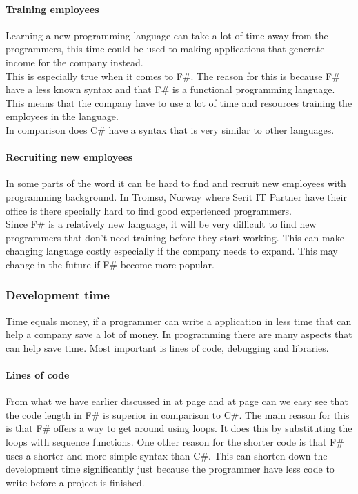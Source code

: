 \documentclass[12pt, a4paper]{article}
\begin{document}
\paragraph{Training employees}
Learning a new programming language can take a lot of time away from the programmers, this time could be used to making applications that generate income for the company instead.\\

This is especially true when it comes to F\#. The reason for this is because F\# have a less known syntax and that F\# is a functional programming language. This means that the company have to use a lot of time and resources training the employees in the language.\\

In comparison does C\# have a syntax that is very similar to other languages.

\paragraph{Recruiting new employees}
In some parts of the word it can be hard to find and recruit new employees with programming background. In Tromsø, Norway where Serit IT Partner have their office is there specially hard to find good experienced programmers.\\

Since F\# is a relatively new language, it will be very difficult to find new programmers that don't need training before they start working. This can make changing language costly especially if the company needs to expand. This may change in the future if F\# become more popular.

\newpage
\subsubsection{Development time}
\label{developmentTime}
Time equals money, if a programmer can write a application in less time that can help a company save a lot of money. In programming there are many aspects that can help save time. Most important is lines of code, debugging and libraries. 

\paragraph{Lines of code}

From what we have earlier discussed in  at page \pageref{linesOfCode} and  at page \pageref{Testimonials} can we easy see that the code length in F\# is superior in comparison to C\#. The main reason for this is that F\# offers a way to get around using loops. It does this by substituting the loops with sequence functions. One other reason for the shorter code is that F\# uses a shorter and more simple syntax than C\#. This can shorten down the development time significantly just because the programmer have less code to write before a project is finished. 
\end{document}
